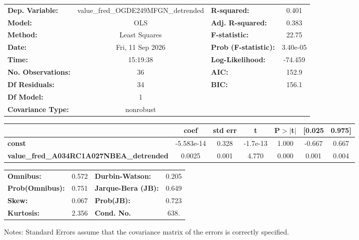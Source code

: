 \begin{center}
\begin{tabular}{lclc}
\toprule
\textbf{Dep. Variable:}                          & value\_fred\_OGDE249MFGN\_detrended & \textbf{  R-squared:         } &     0.401   \\
\textbf{Model:}                                  &                 OLS                 & \textbf{  Adj. R-squared:    } &     0.383   \\
\textbf{Method:}                                 &            Least Squares            & \textbf{  F-statistic:       } &     22.75   \\
\textbf{Date:}                                   &           Fri, 11 Sep 2026          & \textbf{  Prob (F-statistic):} &  3.40e-05   \\
\textbf{Time:}                                   &               15:19:38              & \textbf{  Log-Likelihood:    } &   -74.459   \\
\textbf{No. Observations:}                       &                    36               & \textbf{  AIC:               } &     152.9   \\
\textbf{Df Residuals:}                           &                    34               & \textbf{  BIC:               } &     156.1   \\
\textbf{Df Model:}                               &                     1               & \textbf{                     } &             \\
\textbf{Covariance Type:}                        &              nonrobust              & \textbf{                     } &             \\
\bottomrule
\end{tabular}
\begin{tabular}{lcccccc}
                                                 & \textbf{coef} & \textbf{std err} & \textbf{t} & \textbf{P$> |$t$|$} & \textbf{[0.025} & \textbf{0.975]}  \\
\midrule
\textbf{const}                                   &   -5.583e-14  &        0.328     &  -1.7e-13  &         1.000        &       -0.667    &        0.667     \\
\textbf{value\_fred\_A034RC1A027NBEA\_detrended} &       0.0025  &        0.001     &     4.770  &         0.000        &        0.001    &        0.004     \\
\bottomrule
\end{tabular}
\begin{tabular}{lclc}
\textbf{Omnibus:}       &  0.572 & \textbf{  Durbin-Watson:     } &    0.205  \\
\textbf{Prob(Omnibus):} &  0.751 & \textbf{  Jarque-Bera (JB):  } &    0.649  \\
\textbf{Skew:}          &  0.067 & \textbf{  Prob(JB):          } &    0.723  \\
\textbf{Kurtosis:}      &  2.356 & \textbf{  Cond. No.          } &     638.  \\
\bottomrule
\end{tabular}
\end{center}

Notes: \newline
 [1] Standard Errors assume that the covariance matrix of the errors is correctly specified.
